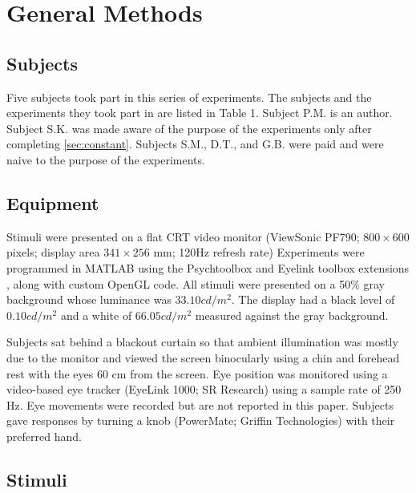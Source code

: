 \documentclass[manuscript]{subfiles}
\begin{document}
\section{General Methods}\label{sec:methods}

\subsection{Subjects}
Five subjects took part in this series of experiments. The subjects and the experiments they took part in are listed in Table 1. Subject P.M. is an author. Subject S.K. was made aware of the purpose of the experiments only after completing \autoref{sec:constant}. Subjects S.M., D.T., and G.B. were paid and were naive to the purpose of the experiments. 

\subsection{Equipment}

Stimuli were presented on a flat CRT video monitor (ViewSonic PF790; $800 \times 600$ pixels; display area $341 \times 256$ mm; 120Hz refresh rate) Experiments were programmed in MATLAB using the Psychtoolbox \citep{Brainard:1997gq} and Eyelink toolbox extensions \citep{Cornelissen:2002wl}, along with custom OpenGL code. All stimuli were presented on a 50\% gray background whose luminance was $33.10 cd/m^2$. The display had a black level of $0.10 cd/m^2$ and a white of $66.05 cd/m^2$ measured against the gray background. 

Subjects sat behind a blackout curtain so that ambient illumination
was mostly due to the monitor and viewed the screen binocularly using
a chin and forehead rest with the eyes 60 cm from the screen. Eye
position was monitored using a video-based eye tracker (EyeLink 1000;
SR Research) using a sample rate of 250 Hz. Eye movements were
recorded but are not reported in this paper. Subjects gave responses
by turning a knob (PowerMate; Griffin Technologies) with their
preferred hand.

\subsection{Stimuli}\label{sec:stimuli}
\end{document}
